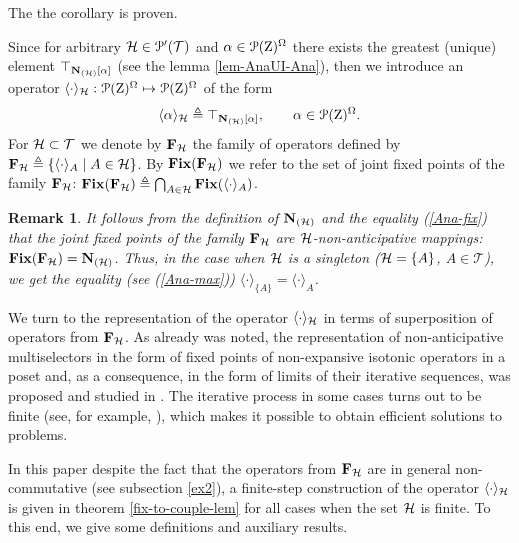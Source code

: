 \documentclass[sn-mathphys,Numbered,pdflatex]{sn-jnl}%
\theoremstyle{thmstyleone}%
\theoremstyle{thmstyletwo}%
\newtheorem{remark}{Remark}%
\theoremstyle{thmstylethree}%
\newcommand{\beq}{\begin{equation}}
\newcommand{\eeq}{\end{equation}}
\newcommand{\mydef}{\mathrel{\triangleq}}%
\newcommand{\icP}[1]{\EuScript{P}({#1})}%
\newcommand{\icPp}[1]{\EuScript{P^\prime}({#1})}%
\newcommand{\naOm}{\ensuremath{\Omega}}%
\newcommand{\naZ}{\ensuremath{\mathrm{Z}}}%
\newcommand{\naTc}{\ensuremath{\mathcal{T}}}%
\newcommand{\AnaN}[2]{\mathbf{N}_{(#1)}\setbox0=\hbox{\text{$#2$}}\ifdim\wd0=0pt\else\left[{#2}\right]\fi}%
\newcommand{\Ana}[2]{\ensuremath{\langle{#1}\rangle_{#2}}}%
\newcommand{\fix}[1]{\ensuremath{{\mathbf{Fix}({#1})}}}%
\newcommand{\fref}[1]{{\rm(\ref{#1})}}   %
\begin{document}
The the corollary is proven.

\bigskip

Since for arbitrary ${\cal H}\in\icPp\naTc$ and $\alpha\in\icP\naZ^\naOm$ there exists the greatest (unique) element $\top_{\AnaN{\cal H} {\alpha}}$ (see the lemma \ref{lem-AnaUI-Ana}), then we introduce an operator $\Ana{\cdot}{{\cal H}}:\icP\naZ^\naOm\mapsto \icP\naZ^\naOm$ of the form
\beq\label{Ana-max-H}
\Ana{\alpha}{{\cal H}}\mydef\top_{\AnaN{\cal H}\alpha},\qquad\alpha\in\icP\naZ^\naOm.
\eeq
For ${\cal H}\subset\naTc$ we denote by ${\bf F}_{\cal H}$ the family of operators defined by ${\bf F}_{\cal H}\mydef\{\Ana{\cdot}{A}\mid A\in{\cal H}\}$.
By $\fix{{\bf F}_{\cal H}}$ we refer to the set of joint fixed points of the family ${\bf F}_{\cal H}$: $\fix{{\bf F}_{\cal H}}\mydef\bigcap_{A\in{\cal H}}\fix{\Ana{\cdot}{A}}$.

\begin{remark}\label{zam-Ana-max_H}
It follows from the definition of $\AnaN{\cal H}{}$ and the equality \fref{Ana-fix} that the joint fixed points of the family ${\bf F}_{\cal H}$ are ${\cal H}$-non-anticipative mappings: $\fix{{\bf F}_{\cal H}}=\AnaN{\cal H}{}$.
Thus, in the case when ${\cal H}$ is a singleton (${\cal H}=\{A\}$, $A\in\naTc$), we get the equality (see \fref{Ana-max}) $\Ana{\cdot}{\{A\}}=\Ana{\cdot}A$.
\end{remark}

\bigskip

We turn to the representation of the operator $\Ana{\cdot}{\cal H}$ in terms of superposition of operators from ${\bf F}_{\cal H}$.
As already was noted, the representation of non-anticipative multiselectors in the form of fixed points of non-expansive isotonic operators in a poset and, as a consequence, in the form of limits of their iterative sequences, was proposed and studied in \cite{Chentsov1997DAN,Chentsov2001DEI,Chentsov2001DEII}.
The iterative process in some cases turns out to be finite (see, for example, \cite[ch.\,5]{SubChe81e}), which makes it possible to obtain efficient solutions to problems.

In this paper despite the fact that the operators from ${\bf F}_{\cal H}$ are in general non-commutative (see subsection \ref{ex2}), a finite-step construction of the operator $\Ana{\cdot}{\cal H}$ is given in theorem \ref{fix-to-couple-lem} for all cases when the set ${\cal H}$ is finite.
To this end, we give some definitions and auxiliary results.
\end{document}

